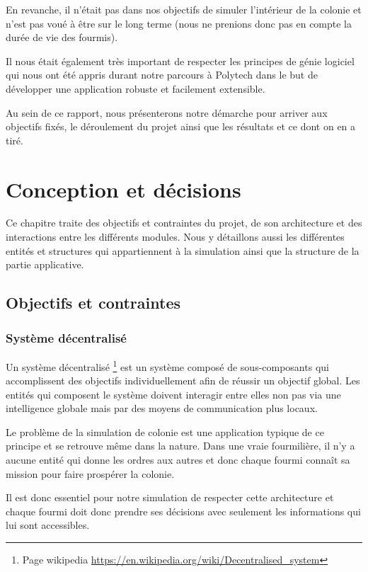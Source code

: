 \documentclass{EPUProjetDi}
\begin{document}
En revanche, il n'était pas dans nos objectifs de simuler l'intérieur de la colonie et n'est pas voué à être sur le long terme
(nous ne prenions donc pas en compte la durée de vie des fourmis).

Il nous était également très important de respecter les principes de génie logiciel qui nous ont été appris durant notre
parcours à Polytech dans le but de développer une application robuste et facilement extensible.

Au sein de ce rapport, nous présenterons notre démarche pour arriver aux objectifs fixés, le déroulement du projet ainsi que les résultats 
et ce dont on en a tiré.

\chapter{Conception et décisions}

Ce chapitre traite des objectifs et contraintes du projet, de son architecture et des interactions entre les différents modules. 
Nous y détaillons aussi les différentes entités et structures qui appartiennent à la simulation ainsi que la structure de la partie applicative.

\section{Objectifs et contraintes}

\subsection*{Système décentralisé}

Un système décentralisé \footnote[1]{Page wikipedia \url{https://en.wikipedia.org/wiki/Decentralised_system}} est un système composé de sous-composants qui accomplissent des objectifs individuellement afin
de réussir un objectif global.
Les entités qui composent le système doivent interagir entre elles non pas via une intelligence globale mais par des moyens
de communication plus locaux.

Le problème de la simulation de colonie est une application typique de ce principe et se retrouve même dans la nature.
Dans une vraie fourmilière, il n'y a aucune entité qui donne les ordres aux autres et donc chaque fourmi connaît sa mission
pour faire prospérer la colonie. 

Il est donc essentiel pour notre simulation de respecter cette architecture et chaque fourmi doit donc prendre ses décisions
avec seulement les informations qui lui sont accessibles.
\end{document}
